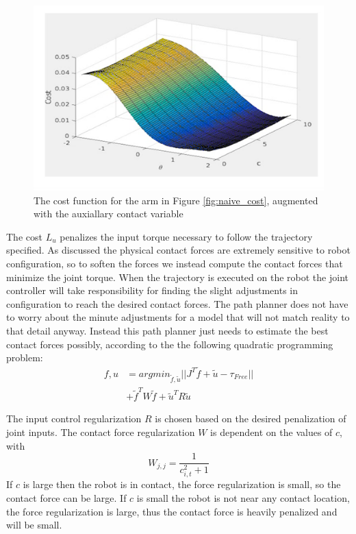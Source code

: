\documentclass[../thesis.tex]{subfiles}
\begin{document}
\begin{figure}
  \centering
  \includegraphics[width=.7\linewidth]{./Planning/augmented_cost.png}
  \caption{The cost function for the arm in Figure \ref{fig:naive_cost}, augmented with the auxiallary contact variable}
  \label{fig:augmented_cost}
\end{figure}


The cost $L_u$ penalizes the input torque necessary to follow the trajectory specified.
As discussed the physical contact forces are extremely sensitive to robot configuration, so to soften the forces we instead compute the contact forces that minimize the joint torque.
When the trajectory is executed on the robot the joint controller will take responsibility for finding the slight adjustments in configuration to reach the desired contact forces.
The path planner does not have to worry about the minute adjustments for a model that will not match reality to that detail anyway.
Instead this path planner just needs to estimate the best contact forces possibly, according to the the following quadratic programming problem:
\begin{align}
f, u &= argmin_{\tilde{f}, \tilde{u}} ||J^T\tilde{f} + \tilde{u} - \tau_{Free}|| \\
&+ \tilde{f}^T W \tilde{f} + \tilde{u}^T R \tilde{u}
\end{align}

The input control regularization $R$ is chosen based on the desired penalization of joint inputs. The contact force regularization $W$ is dependent on the values of $c$, with 
$$W_{j,j} = \frac{1}{c_{i,t}^2 + 1}$$
If $c$ is large then the robot is in contact, the force regularization is small, so the contact force can be large. If $c$ is small the robot is not near any contact location, the force regularization is large, thus the contact force is heavily penalized and will be small.
\end{document}
